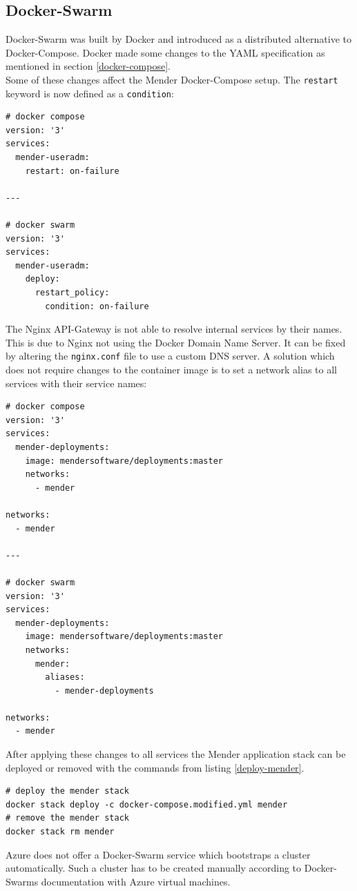 \subsection{Docker-Swarm}
Docker-Swarm was built by Docker and introduced as a distributed alternative to Docker-Compose. Docker made some changes to the YAML specification as mentioned in section \ref{docker-compose}.\\
Some of these changes affect the Mender Docker-Compose setup. The \verb|restart| keyword is now defined as a \verb|condition|:
\begin{code}
  \begin{verbatim}
# docker compose
version: '3'
services:
  mender-useradm:
    restart: on-failure

---

# docker swarm
version: '3'
services:
  mender-useradm:
    deploy:
      restart_policy:
        condition: on-failure
  \end{verbatim}
\end{code}
The Nginx API-Gateway is not able to resolve internal services by their names. This is due to Nginx not using the Docker Domain Name Server. It can be fixed by altering the \verb|nginx.conf| file to use a custom DNS server. A solution which does not require changes to the container image is to set a network alias to all services with their service names:
\begin{code}
  \begin{verbatim}
# docker compose
version: '3'
services:
  mender-deployments:
    image: mendersoftware/deployments:master
    networks:
      - mender

networks:
  - mender

---

# docker swarm
version: '3'
services:
  mender-deployments:
    image: mendersoftware/deployments:master
    networks:
      mender:
        aliases:
          - mender-deployments

networks:
  - mender
  \end{verbatim}
\end{code}
After applying these changes to all services the Mender application stack can be deployed or removed with the commands from listing \ref{deploy-mender}.
\begin{code}
  \label{deploy-mender}
  \begin{verbatim}
# deploy the mender stack
docker stack deploy -c docker-compose.modified.yml mender
# remove the mender stack
docker stack rm mender
  \end{verbatim}
\end{code}
Azure does not offer a Docker-Swarm service which bootstraps a cluster automatically. Such a cluster has to be created manually according to Docker-Swarms documentation with Azure virtual machines.


